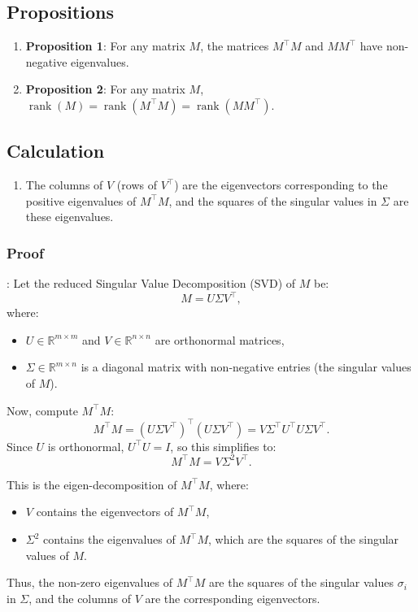 \documentclass{article}
\begin{document}
\subsection{Propositions}
\begin{enumerate}
    \item \textbf{Proposition 1}: For any matrix \( M \), the matrices \( M^\top M \) and \( M M^\top \) have non-negative eigenvalues.  
    \item \textbf{Proposition 2}: For any matrix \( M \), \( \operatorname{rank}(M) = \operatorname{rank}(M^\top M) = \operatorname{rank}(M M^\top) \).
\end{enumerate}

\subsection{Calculation}
\begin{enumerate}
    \item The columns of \( V \) (rows of \( V^\top \)) are the eigenvectors corresponding to the positive eigenvalues of \( M^\top M \), and the squares of the singular values in \( \Sigma \) are these eigenvalues.
\end{enumerate}

\subsubsection{Proof}:  
Let the reduced Singular Value Decomposition (SVD) of \( M \) be:
\[
M = U \Sigma V^\top,
\]
where:
\begin{itemize}
    \item \( U \in \mathbb{R}^{m \times m} \) and \( V \in \mathbb{R}^{n \times n} \) are orthonormal matrices,
    \item \( \Sigma \in \mathbb{R}^{m \times n} \) is a diagonal matrix with non-negative entries (the singular values of \( M \)).
\end{itemize}

Now, compute \( M^\top M \):
\[
M^\top M = (U \Sigma V^\top)^\top (U \Sigma V^\top) = V \Sigma^\top U^\top U \Sigma V^\top.
\]
Since \( U \) is orthonormal, \( U^\top U = I \), so this simplifies to:
\[
M^\top M = V \Sigma^2 V^\top.
\]

This is the eigen-decomposition of \( M^\top M \), where:
\begin{itemize}
    \item \( V \) contains the eigenvectors of \( M^\top M \),
    \item \( \Sigma^2 \) contains the eigenvalues of \( M^\top M \), which are the squares of the singular values of \( M \).
\end{itemize}
Thus, the non-zero eigenvalues of \( M^\top M \) are the squares of the singular values \( \sigma_i \) in \( \Sigma \), and the columns of \( V \) are the corresponding eigenvectors.
\end{document}
